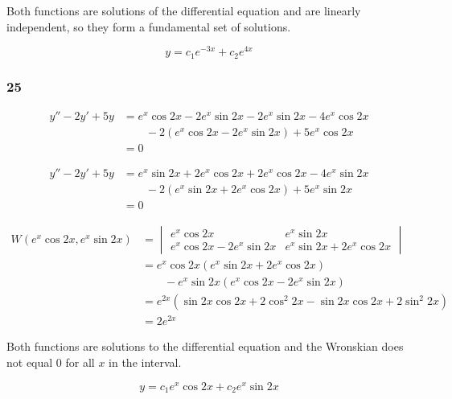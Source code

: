 \documentclass{article}
\begin{document}
Both functions are solutions of the differential equation and are linearly independent, so they form a fundamental set of solutions.

\[y = c_1 e^{-3x} + c_2 e^{4x}\]

\subsubsection{25}

\begin{align*}
  y'' - 2y' + 5y & = e^x \cos 2x -2e^x \sin 2x -2e^x \sin 2x -4e^x \cos 2x \\
                 & \qquad - 2(e^x \cos 2x -2e^x \sin 2x) + 5e^x \cos 2x    \\
                 & = 0
\end{align*}

\begin{align*}
  y'' - 2y' + 5y & = e^x \sin 2x + 2e^x \cos 2x + 2e^x \cos 2x - 4e^x \sin 2x \\
                 & \qquad - 2(e^x \sin 2x + 2e^x \cos 2x) + 5e^x \sin 2x      \\
                 & = 0
\end{align*}

\begin{align*}
  W(e^x \cos 2x, e^x \sin 2x) & = \begin{vmatrix}
                                    e^x \cos 2x                & e^x \sin 2x                \\
                                    e^x \cos 2x - 2e^x \sin 2x & e^x \sin 2x + 2e^x \cos 2x
                                  \end{vmatrix}                \\
                              & = e^x \cos 2x (e^x \sin 2x + 2e^x \cos 2x)                               \\
                              & \qquad - e^x \sin 2x (e^x \cos 2x - 2e^x \sin 2x)                        \\
                              & = e^{2x} (\sin 2x \cos 2x + 2 \cos^2 2x - \sin 2x \cos 2x + 2 \sin^2 2x) \\
                              & = 2e^{2x}
\end{align*}

Both functions are solutions to the differential equation and the Wronskian does not equal $0$ for all $x$ in the interval.

\[y = c_1 e^x \cos 2x + c_2 e^x \sin 2x\]
\end{document}
